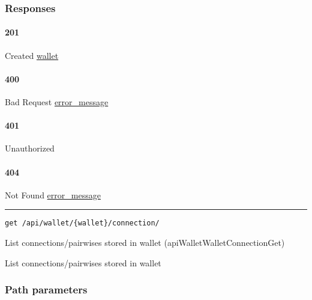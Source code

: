 \hypertarget{responses-184}{%
\subsubsection{Responses}\label{responses-184}}

\hypertarget{section-592}{%
\paragraph{201}\label{section-592}}

Created \protect\hyperlink{wallet}{wallet}

\hypertarget{section-593}{%
\paragraph{400}\label{section-593}}

Bad Request \protect\hyperlink{error_message}{error\_message}

\hypertarget{section-594}{%
\paragraph{401}\label{section-594}}

Unauthorized \protect\hyperlink{}{}

\hypertarget{section-595}{%
\paragraph{404}\label{section-595}}

Not Found \protect\hyperlink{error_message}{error\_message}

\begin{center}\rule{0.5\linewidth}{\linethickness}\end{center}

\protect\hypertarget{apiWalletWalletConnectionGet}{}{}

\begin{verbatim}
get /api/wallet/{wallet}/connection/
\end{verbatim}

List connections/pairwises stored in wallet
({apiWalletWalletConnectionGet})

List connections/pairwises stored in wallet

\hypertarget{path-parameters-100}{%
\subsubsection{Path parameters}\label{path-parameters-100}}

